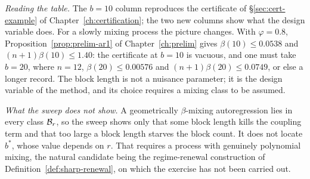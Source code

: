 \documentclass[../../../main.tex]{subfiles}
\begin{document}

\emph{Reading the table.} The $b=10$ column reproduces the certificate of \S\ref{sec:cert-example} of Chapter~\ref{ch:certification}; the two new columns show what the design variable does. For a slowly mixing process the picture changes. With $\varphi=0.8$, Proposition~\ref{prop:prelim-ar1} of Chapter~\ref{ch:prelim} gives $\beta(10)\le0.0538$ and $(n+1)\beta(10)\le1.40$: the certificate at $b=10$ is vacuous, and one must take $b=20$, where $n=12$, $\beta(20)\le0.00576$ and $(n+1)\beta(20)\le0.0749$, or else a longer record. The block length is not a nuisance parameter; it is the design variable of the method, and its choice requires a mixing class to be assumed.

\emph{What the sweep does not show.} A geometrically $\beta$-mixing autoregression lies in every class $\mathcal B_{r}$, so the sweep shows only that some block length kills the coupling term and that too large a block length starves the block count. It does not locate $b^*$, whose value depends on $r$. That requires a process with genuinely polynomial mixing, the natural candidate being the regime-renewal construction of Definition~\ref{def:sharp-renewal}, on which the exercise has not been carried out.
\end{document}
